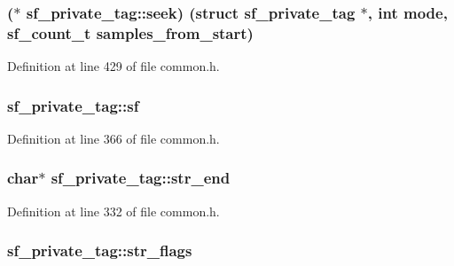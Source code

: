 \subsubsection[{\texorpdfstring{seek}{seek}}]{($\ast$ sf\+\_\+private\+\_\+tag\+::seek) (struct {\bf sf\+\_\+private\+\_\+tag} $\ast$, {\bf int} mode, {\bf sf\+\_\+count\+\_\+t} samples\+\_\+from\+\_\+start)}\hypertarget{structsf__private__tag_ab36e940f006babe39879e21e743650ca}{}\label{structsf__private__tag_ab36e940f006babe39879e21e743650ca}


Definition at line 429 of file common.\+h.

\subsubsection[{\texorpdfstring{sf}{sf}}]{ sf\+\_\+private\+\_\+tag\+::sf}\hypertarget{structsf__private__tag_aaa8084e49c5f62998a50e5d6d57e11bd}{}\label{structsf__private__tag_aaa8084e49c5f62998a50e5d6d57e11bd}


Definition at line 366 of file common.\+h.

\subsubsection[{\texorpdfstring{str\+\_\+end}{str_end}}]{\setlength{\rightskip}{0pt plus 5cm}char$\ast$ sf\+\_\+private\+\_\+tag\+::str\+\_\+end}\hypertarget{structsf__private__tag_ab303ff13195dc67a711cc51f1cd9c11c}{}\label{structsf__private__tag_ab303ff13195dc67a711cc51f1cd9c11c}


Definition at line 332 of file common.\+h.

\subsubsection[{\texorpdfstring{str\+\_\+flags}{str_flags}}]{ sf\+\_\+private\+\_\+tag\+::str\+\_\+flags}\hypertarget{structsf__private__tag_ad24506f93bce90fd79743e25f6aa9391}{}\label{structsf__private__tag_ad24506f93bce90fd79743e25f6aa9391}



